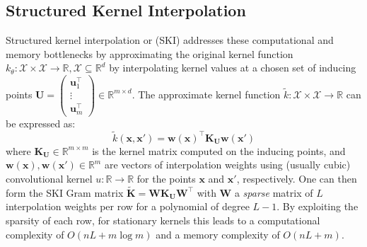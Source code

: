 \subsection{Structured Kernel Interpolation}\label{subsec:ski}
Structured kernel interpolation \citep{wilson2015kernel} or (SKI) addresses these computational and memory bottlenecks by approximating the original kernel function \(k_\theta:\mathcal{X}\times \mathcal{X}\rightarrow \mathbb{R},\mathcal{X}\subseteq\mathbb{R}^d\) by interpolating kernel values at a chosen set of inducing points \(\mathbf{U}=\left(\begin{array}{c}
     \textbf{u}_1^\top\\
     \vdots\\
     \textbf{u}_m^\top
\end{array}\right)\in \mathbb{R}^{m\times d}\). The approximate kernel function \(\tilde{k}:\mathcal{X}\times \mathcal{X}\rightarrow\mathbb{R}\) can be expressed as:
\[
\tilde{k}(\mathbf{x}, \mathbf{x}') = \mathbf{w}(\mathbf{x})^{\top} \mathbf{K}_{\mathbf{U}} \mathbf{w}(\mathbf{x}')
\]
where \(\mathbf{K}_{\mathbf{U}}\in \mathbb{R}^{m\times m}\) is the kernel matrix computed on the inducing points, and \(\mathbf{w}(\mathbf{x}),\mathbf{w}(\mathbf{x}')\in \mathbb{R}^m\) are vectors of interpolation weights using (usually cubic) convolutional kernel $u:\mathbb{R}\rightarrow \mathbb{R}$ for the points $\textbf{x}$ and $\textbf{x}'$, respectively. One can then form the SKI Gram matrix $\tilde{\textbf{K}}=\textbf{W}\textbf{K}_\textbf{U}\textbf{W}^\top$ with $\textbf{W}$ a \textit{sparse} matrix of $L$ interpolation weights per row for a polynomial of degree $L-1$. By exploiting the sparsity of each row, for stationary kernels this leads to a computational complexity of $O(nL+m\log m)$ and a memory complexity of $O(nL+m)$.

